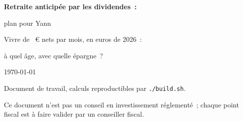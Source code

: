 \begin{titlepage}
  \centering
  \vspace*{0.2\textheight}
  {\LARGE\bfseries Retraite anticip\'ee par les dividendes~:\par
  \medskip plan pour Yann\par}
  \vspace{2em}
  {\large Vivre de \ZielMonat~€ nets par mois, en euros de 2026~:\par
  \`a quel \^age, avec quelle \'epargne~?\par}
  \vspace{3em}
  {\large \today\par}
  \vfill
  {\small Document de travail, calculs reproductibles par \texttt{./build.sh}.\par}
  \medskip
  {\small Ce document n'est pas un conseil en investissement r\'eglement\'e~; chaque point fiscal
  est \`a faire valider par un conseiller fiscal.\par}
\end{titlepage}
